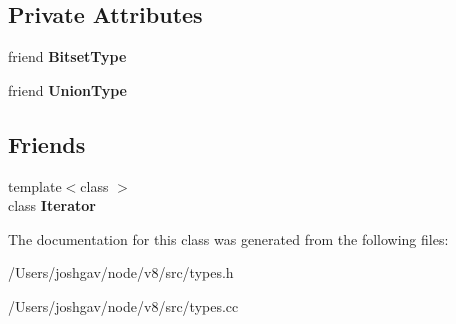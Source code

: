 \subsection*{Private Attributes}
\begin{DoxyCompactItemize}
\item 
friend {\bfseries Bitset\+Type}\hypertarget{classv8_1_1internal_1_1_type_a4fba0594219dd95f7fc1d756803faf14}{}\label{classv8_1_1internal_1_1_type_a4fba0594219dd95f7fc1d756803faf14}

\item 
friend {\bfseries Union\+Type}\hypertarget{classv8_1_1internal_1_1_type_a22c962e29c4fabed508ba711bcbc4bfa}{}\label{classv8_1_1internal_1_1_type_a22c962e29c4fabed508ba711bcbc4bfa}

\end{DoxyCompactItemize}
\subsection*{Friends}
\begin{DoxyCompactItemize}
\item 
{\footnotesize template$<$class $>$ }\\class {\bfseries Iterator}\hypertarget{classv8_1_1internal_1_1_type_ade6ce99c1c6680cd228fe1aa6927bdaf}{}\label{classv8_1_1internal_1_1_type_ade6ce99c1c6680cd228fe1aa6927bdaf}

\end{DoxyCompactItemize}


The documentation for this class was generated from the following files\+:\begin{DoxyCompactItemize}
\item 
/\+Users/joshgav/node/v8/src/types.\+h\item 
/\+Users/joshgav/node/v8/src/types.\+cc\end{DoxyCompactItemize}

